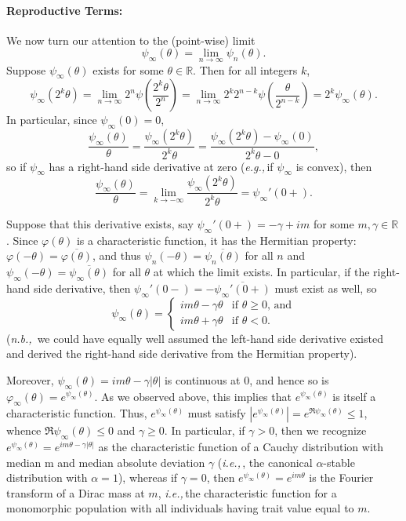 \documentclass{article}
\newcommand{\ie}{\textit{i.e.,}\,}
\newcommand{\eg}{\textit{e.g.,}\,}
\newcommand{\nb}{\textit{n.b.,}\, }
\newcommand{\1}{\mathbbm{1}}
\theoremstyle{remark}
\theoremstyle{definition}
\begin{document}
\paragraph{Reproductive Terms:}
We now turn our attention to the (point-wise) limit
\[
		\psi_{\infty}(\theta) = \lim_{n \to \infty} \psi_{n}(\theta).
\]
Suppose $\psi_{\infty}(\theta)$ exists for some $\theta \in \mathbb{R}$.  Then for all integers $k$, 
\[
	\psi_{\infty}(2^{k} \theta) = \lim_{n \to \infty} 2^{n}\psi\left(\frac{2^{k} \theta}{2^{n}}\right) =  \lim_{n \to \infty} 2^{k} 2^{n-k} \psi\left(\frac{\theta}{2^{n-k}}\right) 
	= 2^{k} \psi_{\infty}(\theta).
\]
In particular, since $\psi_{\infty}(0) = 0$, 
\[
	\frac{\psi_{\infty}(\theta)}{\theta} = \frac{\psi_{\infty}(2^{k} \theta)}{2^{k}\theta} = \frac{\psi_{\infty}(2^{k} \theta)-\psi_{\infty}(0)}{2^{k}\theta - 0}, 
\]
so if $\psi_{\infty}$ has a right-hand side derivative at zero (\eg if $\psi_{\infty}$ is convex), then
\[
	\frac{\psi_{\infty}(\theta)}{\theta} = \lim_{k \to -\infty} \frac{\psi_{\infty}(2^{k} \theta)}{2^{k}\theta} = \psi_{\infty}'(0+).
\]

Suppose that this derivative exists, say $\psi_{\infty}'(0+) = -\gamma + i m$ for some $m, \gamma \in \mathbb{R}$.  Since $\varphi(\theta)$ is a characteristic function, it has the Hermitian property: $\varphi(-\theta) = \overline{\varphi(\theta)}$, and thus $\psi_{n}(-\theta) = \overline{\psi_{n}(\theta)}$ for all $n$ and $\psi_{\infty}(-\theta) = \overline{\psi_{\infty}(\theta)}$ for all $\theta$ at which the limit exists.    In particular, if the right-hand side derivative, then $\psi_{\infty}'(0-) = -\overline{\psi_{\infty}'(0+)}$ must exist as well, so
\[
	\psi_{\infty}(\theta) = \begin{cases} 
		i m\theta - \gamma \theta & \text{if $\theta \geq 0$, and}\\
		i m\theta + \gamma \theta & \text{if $\theta < 0$}.
	\end{cases}
\]
(\nb we could have equally well assumed the left-hand side derivative existed and derived the right-hand side derivative from the Hermitian property).  

Moreover,  $\psi_{\infty}(\theta) = i m \theta - \gamma |\theta|$ is continuous at 0, and hence so is $\varphi_{\infty}(\theta) = e^{\psi_{\infty}(\theta)}$.  As we observed above, this implies that $e^{\psi_{\infty}(\theta)}$ is itself a characteristic function.  Thus, $e^{\psi_{\infty}(\theta)}$ must satisfy $|e^{\psi_{\infty}(\theta)}| = e^{\Re \psi_{\infty}(\theta)} \leq 1$, whence $\Re \psi_{\infty}(\theta) \leq 0$ and $\gamma \geq 0$.  In particular, if $\gamma > 0$, then we recognize $e^{\psi_{\infty}(\theta)} = e^{im \theta -\gamma|\theta|}$ as the characteristic function of a Cauchy distribution with median m and median absolute deviation $\gamma$ (\ie, the canonical $\alpha$-stable distribution with $\alpha=1$),  whereas if $\gamma = 0$, then $e^{\psi_{\infty}(\theta)} = e^{im \theta}$ is the Fourier transform of a Dirac mass at $m$, \ie the characteristic function for a monomorphic population with all individuals having trait value equal to $m$.
\end{document}
